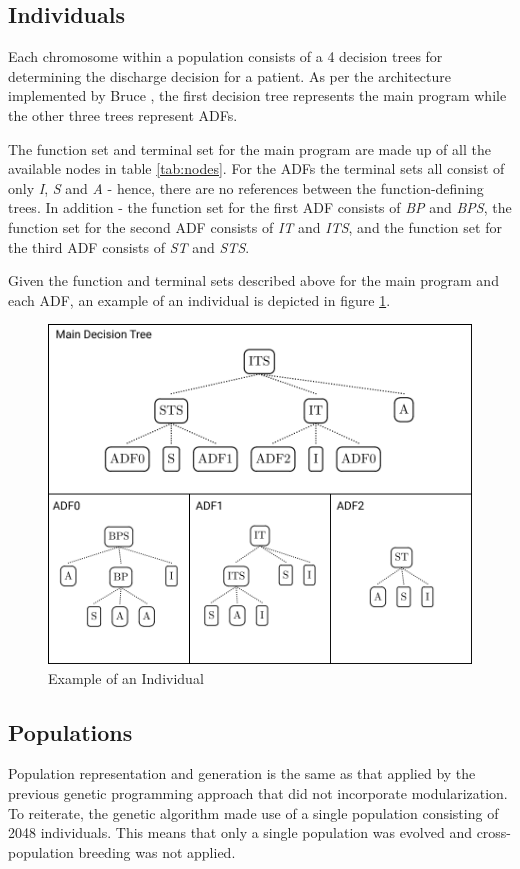 \subsection{Individuals}\label{sec:individuals}
Each chromosome within a population consists of a 4 decision trees for determining the discharge decision for a patient. As per the architecture implemented by Bruce \cite{bruce1995application}, the first decision tree represents the main program while the other three trees represent ADFs.

The function set and terminal set for the main program are made up of all the available nodes in table \ref{tab:nodes}. For the ADFs the terminal sets all consist of only \emph{I}, \emph{S} and \emph{A} - hence, there are no references between the function-defining trees. In addition - the function set for the first ADF consists of \emph{BP} and \emph{BPS}, the function set for the second ADF consists of \emph{IT} and \emph{ITS}, and the function set for the third ADF consists of \emph{ST} and \emph{STS}.

Given the function and terminal sets described above for the main program and each ADF, an example of an individual is depicted in figure \ref{fig:individual}.

\begin{figure}[H]
\centering
\includegraphics[width=\textwidth]{report/02_representation/chromosome.png}
\caption{Example of an Individual}
\label{fig:individual}
\end{figure}


\subsection{Populations}
Population representation and generation is the same as that applied by the previous genetic programming approach that did not incorporate modularization. To reiterate, the genetic algorithm made use of a single population consisting of 2048 individuals. This means that only a single population was evolved and cross-population breeding was not applied.

